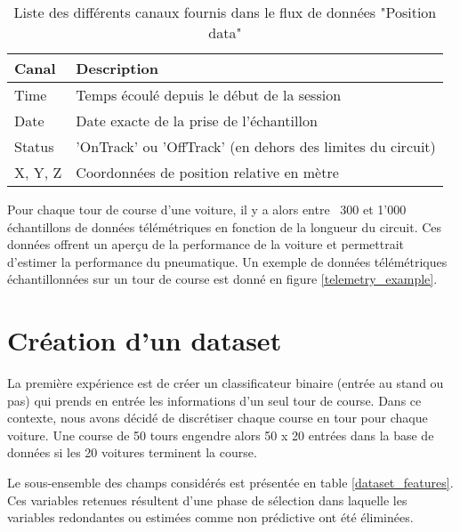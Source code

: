 \begin{table}[H]
    \begin{center}
        \caption{Liste des différents canaux fournis dans le flux de données "Position data"}
        \begin{tabular}{l|l}
            Canal   & Description                                                \\ \hline
            Time    & Temps écoulé depuis le début de la session                 \\
            Date    & Date exacte de la prise de l'échantillon                   \\
            Status  & 'OnTrack' ou 'OffTrack' (en dehors des limites du circuit) \\
            X, Y, Z & Coordonnées de position relative en mètre
        \end{tabular}
    \end{center}
\end{table}

Pour chaque tour de course d'une voiture, il y a alors entre ~300 et 1'000 échantillons de données télémétriques en fonction de la longueur du circuit.
Ces données offrent un aperçu de la performance de la voiture et permettrait d'estimer la performance du pneumatique.
Un exemple de données télémétriques échantillonnées sur un tour de course est donné en figure \ref{telemetry_example}.

\section{Création d'un dataset}

La première expérience est de créer un classificateur binaire (entrée au stand ou pas) qui prends en entrée les informations d'un seul tour de course.
Dans ce contexte, nous avons décidé de discrétiser chaque course en tour pour chaque voiture.
Une course de 50 tours engendre alors 50 x 20 entrées dans la base de données si les 20 voitures terminent la course.

Le sous-ensemble des champs considérés est présentée en table \ref{dataset_features}. Ces variables retenues résultent d'une phase de sélection dans laquelle
les variables redondantes ou estimées comme non prédictive ont été éliminées.

